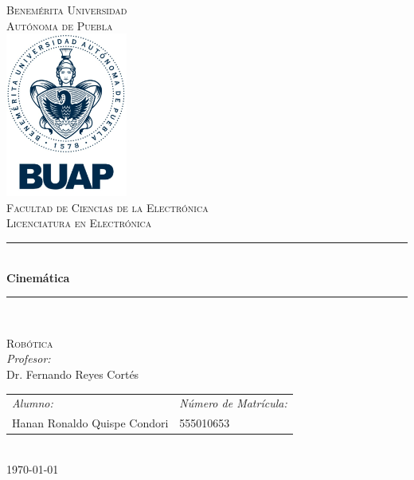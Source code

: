 \documentclass[12pt]{article}
\date{\today}
\begin{document}
\begin{titlepage}
\newcommand{\HRule}{\rule{\linewidth}{0.5mm}} 
\center
\textsc{\LARGE  Benemérita Universidad \\[0.2cm] Autónoma de Puebla}\\[1.5cm] 
\includegraphics[width=4cm]{IMAGENES/escudo}\\[1cm]
\textsc{\Large Facultad de Ciencias de la Electrónica}\\[0.5cm] 
\textsc{\large Licenciatura en Electrónica}\\[0.5cm]
\HRule \\[0.4cm]
{ \huge \bfseries Cinemática}\\[0.4cm] 
\HRule \\[1.5cm]
\begin{minipage}{\textwidth}
\center 
\textsc{\LARGE Robótica}\\[1.7cm] 
\emph{Profesor:} \\
Dr. Fernando Reyes Cortés \\[1cm]
\begin{tabular}{ll}
\emph{Alumno:} & \emph{Número de Matrícula:}\\
Hanan Ronaldo Quispe Condori  & 555010653\\
\end{tabular}
\end{minipage}\\[2cm]
\today
\end{titlepage}

\newpage
\end{document}
